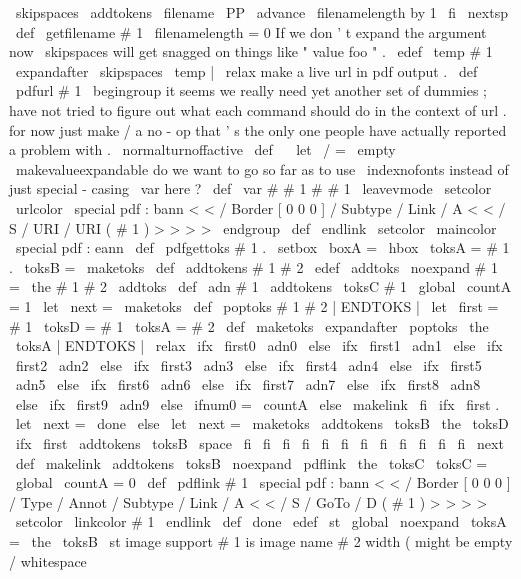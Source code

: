 {{{{\
skipspaces
\
addtokens
{
\
filename
}
{
\
PP
}
%
\
advance
\
filenamelength
by
1
\
fi
\
nextsp
}
\
def
\
getfilename
#
1
{
%
\
filenamelength
=
0
%
If
we
don
'
t
expand
the
argument
now
\
skipspaces
will
get
%
snagged
on
things
like
"
value
{
foo
}
"
.
\
edef
\
temp
{
#
1
}
%
\
expandafter
\
skipspaces
\
temp
|
\
relax
}
%
make
a
live
url
in
pdf
output
.
\
def
\
pdfurl
#
1
{
%
\
begingroup
%
it
seems
we
really
need
yet
another
set
of
dummies
;
have
not
%
tried
to
figure
out
what
each
command
should
do
in
the
context
%
of
url
.
for
now
just
make
/
a
no
-
op
that
'
s
the
only
one
%
people
have
actually
reported
a
problem
with
.
%
\
normalturnoffactive
\
def
\
{
}
%
\
let
\
/
=
\
empty
\
makevalueexpandable
%
do
we
want
to
go
so
far
as
to
use
\
indexnofonts
instead
of
just
%
special
-
casing
\
var
here
?
\
def
\
var
#
#
1
{
#
#
1
}
%
%
\
leavevmode
\
setcolor
{
\
urlcolor
}
%
\
special
{
pdf
:
bann
<
<
/
Border
[
0
0
0
]
/
Subtype
/
Link
/
A
<
<
/
S
/
URI
/
URI
(
#
1
)
>
>
>
>
}
%
\
endgroup
}
\
def
\
endlink
{
\
setcolor
{
\
maincolor
}
\
special
{
pdf
:
eann
}
}
\
def
\
pdfgettoks
#
1
.
{
\
setbox
\
boxA
=
\
hbox
{
\
toksA
=
{
#
1
.
}
\
toksB
=
{
}
\
maketoks
}
}
\
def
\
addtokens
#
1
#
2
{
\
edef
\
addtoks
{
\
noexpand
#
1
=
{
\
the
#
1
#
2
}
}
\
addtoks
}
\
def
\
adn
#
1
{
\
addtokens
{
\
toksC
}
{
#
1
}
\
global
\
countA
=
1
\
let
\
next
=
\
maketoks
}
\
def
\
poptoks
#
1
#
2
|
ENDTOKS
|
{
\
let
\
first
=
#
1
\
toksD
=
{
#
1
}
\
toksA
=
{
#
2
}
}
\
def
\
maketoks
{
%
\
expandafter
\
poptoks
\
the
\
toksA
|
ENDTOKS
|
\
relax
\
ifx
\
first0
\
adn0
\
else
\
ifx
\
first1
\
adn1
\
else
\
ifx
\
first2
\
adn2
\
else
\
ifx
\
first3
\
adn3
\
else
\
ifx
\
first4
\
adn4
\
else
\
ifx
\
first5
\
adn5
\
else
\
ifx
\
first6
\
adn6
\
else
\
ifx
\
first7
\
adn7
\
else
\
ifx
\
first8
\
adn8
\
else
\
ifx
\
first9
\
adn9
\
else
\
ifnum0
=
\
countA
\
else
\
makelink
\
fi
\
ifx
\
first
.
\
let
\
next
=
\
done
\
else
\
let
\
next
=
\
maketoks
\
addtokens
{
\
toksB
}
{
\
the
\
toksD
}
\
ifx
\
first
\
addtokens
{
\
toksB
}
{
\
space
}
\
fi
\
fi
\
fi
\
fi
\
fi
\
fi
\
fi
\
fi
\
fi
\
fi
\
fi
\
fi
\
next
}
\
def
\
makelink
{
\
addtokens
{
\
toksB
}
%
{
\
noexpand
\
pdflink
{
\
the
\
toksC
}
}
\
toksC
=
{
}
\
global
\
countA
=
0
}
\
def
\
pdflink
#
1
{
%
\
special
{
pdf
:
bann
<
<
/
Border
[
0
0
0
]
/
Type
/
Annot
/
Subtype
/
Link
/
A
<
<
/
S
/
GoTo
/
D
(
#
1
)
>
>
>
>
}
%
\
setcolor
{
\
linkcolor
}
#
1
\
endlink
}
\
def
\
done
{
\
edef
\
st
{
\
global
\
noexpand
\
toksA
=
{
\
the
\
toksB
}
}
\
st
}
%
%
%
image
support
%
%
#
1
is
image
name
#
2
width
(
might
be
empty
/
whitespace
}}}
